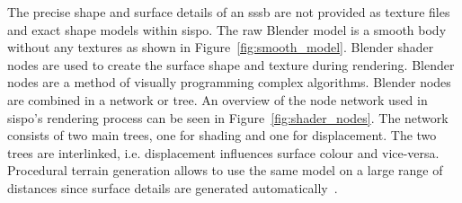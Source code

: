 \begin{table}[htb]
    \centering
    \caption{Input parameters that define an instrument in \gls{sispo}.}
    \label{tab:inst_input}
\end{table}

The precise shape and surface details of an \gls{sssb} are not provided as texture files and exact shape models within \gls{sispo}. The raw Blender model is a smooth body without any textures as shown in Figure~\ref{fig:smooth_model}. Blender shader nodes are used to create the surface shape and texture during rendering. Blender nodes are a method of visually programming complex algorithms. Blender nodes are combined in a network or tree. An overview of the node network used in \gls{sispo}'s rendering process can be seen in Figure~\ref{fig:shader_nodes}. The network consists of two main trees, one for shading and one for displacement. The two trees are interlinked, i.e. displacement influences surface colour and vice-versa. Procedural terrain generation allows to use the same model on a large range of distances since surface details are generated automatically~\cite{IntroductionNodes}.

